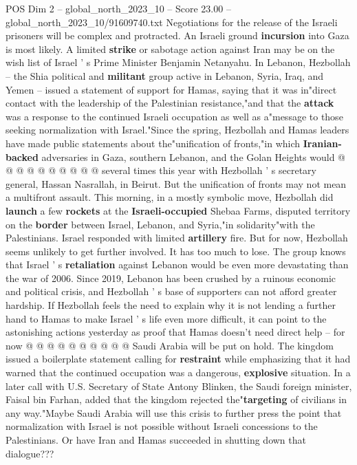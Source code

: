 \begin{textsample}{POS Dim 2 – global\_north\_2023\_10 – Score 23.00 – global\_north\_2023\_10/91609740.txt}
Negotiations for the release of the Israeli prisoners will be complex and protracted.
An Israeli ground \textbf{incursion} into Gaza is most likely.
A limited \textbf{strike} or sabotage action against Iran may be on the wish list of Israel ' s Prime Minister Benjamin Netanyahu.
In Lebanon, Hezbollah -- the Shia political and \textbf{militant} group active in Lebanon, Syria, Iraq, and Yemen -- issued a statement of support for Hamas, saying that it was in"direct contact with the leadership of the Palestinian resistance,"and that the \textbf{attack} was a response to the continued Israeli occupation as well as a"message to those seeking normalization with Israel."Since the spring, Hezbollah and Hamas leaders have made public statements about the"unification of fronts,"in which \textbf{Iranian-backed} adversaries in Gaza, southern Lebanon, and the Golan Heights would @ @ @ @ @ @ @ @ @ @ several times this year with Hezbollah ' s secretary general, Hassan Nasrallah, in Beirut.
But the unification of fronts may not mean a multifront assault.
This morning, in a mostly symbolic move, Hezbollah did \textbf{launch} a few \textbf{rockets} at the \textbf{Israeli-occupied} Shebaa Farms, disputed territory on the \textbf{border} between Israel, Lebanon, and Syria,"in solidarity"with the Palestinians.
Israel responded with limited \textbf{artillery} fire.
But for now, Hezbollah seems unlikely to get further involved.
It has too much to lose.
The group knows that Israel ' s \textbf{retaliation} against Lebanon would be even more devastating than the war of 2006.
Since 2019, Lebanon has been crushed by a ruinous economic and political crisis, and Hezbollah ' s base of supporters can not afford greater hardship.
If Hezbollah feels the need to explain why it is not lending a further hand to Hamas to make Israel ' s life even more difficult, it can point to the astonishing actions yesterday as proof that Hamas doesn't need direct help -- for now @ @ @ @ @ @ @ @ @ @ Saudi Arabia will be put on hold.
The kingdom issued a boilerplate statement calling for \textbf{restraint} while emphasizing that it had warned that the continued occupation was a dangerous, \textbf{explosive} situation.
In a later call with U.S.
Secretary of State Antony Blinken, the Saudi foreign minister, Faisal bin Farhan, added that the kingdom rejected the"\textbf{targeting} of civilians in any way."Maybe Saudi Arabia will use this crisis to further press the point that normalization with Israel is not possible without Israeli concessions to the Palestinians.
Or have Iran and Hamas succeeded in shutting down that dialogue???

\end{textsample}
